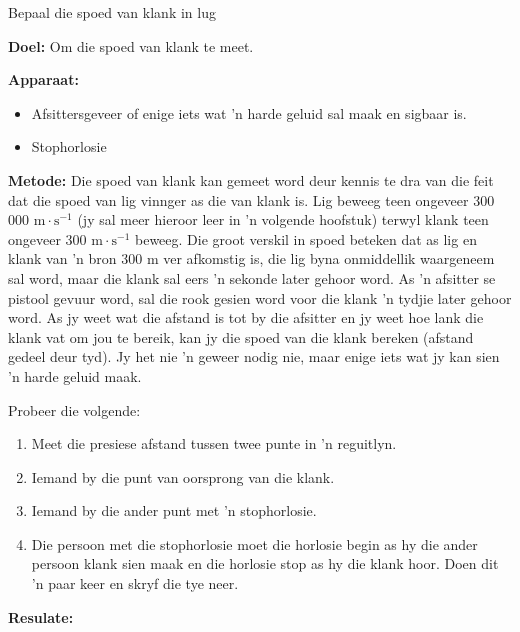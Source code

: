 \vspace*{-0.5cm}
\begin{i_experiment}{Bepaal die spoed van klank in lug}

\textbf{Doel:} Om die spoed van klank te meet.

\textbf{Apparaat:} 
\begin{itemize}
 \item Afsittersgeveer of enige iets wat 'n harde geluid sal maak en sigbaar is. 
  \item Stophorlosie
  \end{itemize}

\textbf{Metode:}
Die spoed van klank kan gemeet word deur kennis te dra van die feit dat die spoed van lig vinnger as die van klank is. Lig beweeg teen ongeveer 300 000 $\text{m}\cdot\text{s}^{-1}$ (jy sal meer hieroor leer in 'n volgende hoofstuk) terwyl klank teen ongeveer 300 $\text{m}\cdot\text{s}^{-1}$ beweeg. Die groot verskil in spoed beteken dat as lig en klank van 'n bron 300 $\text{m}$ ver afkomstig is, die lig byna onmiddellik waargeneem sal word, maar die klank sal eers 'n sekonde later gehoor word. As 'n afsitter se pistool gevuur word, sal die rook gesien word voor die klank 'n tydjie later gehoor word. As jy weet wat die afstand is tot by die afsitter en jy weet hoe lank die klank vat om jou te bereik,  kan jy die spoed van die klank bereken (afstand gedeel deur tyd). Jy het nie 'n geweer nodig nie, maar enige iets wat jy kan sien 'n harde geluid maak.    


Probeer die volgende:
\begin{enumerate}[noitemsep, label=\textbf{\arabic*}. ] 
\item Meet die presiese afstand tussen twee punte in 'n reguitlyn.
\item Iemand by die punt van oorsprong van die klank.
\item Iemand by die ander punt met 'n stophorlosie.
\item Die persoon met die stophorlosie moet die horlosie begin as hy die ander persoon klank sien maak en die horlosie stop as hy die klank hoor. Doen dit 'n paar keer en skryf die tye neer. 

\end{enumerate}

\textbf{Resulate:}


\end{i_experiment}
